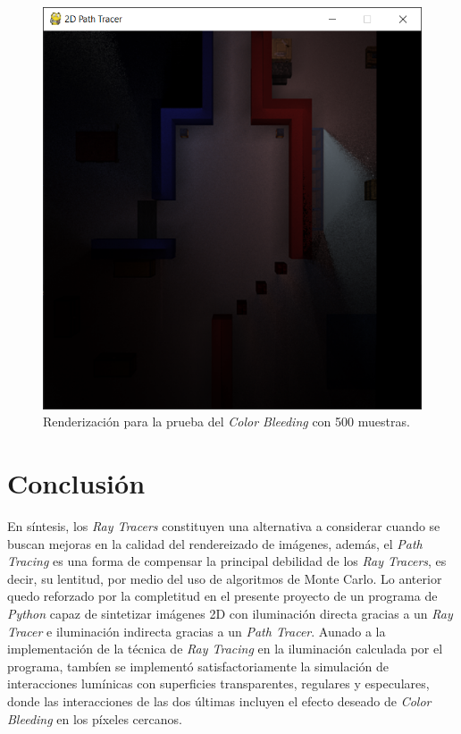 \documentclass[conference]{IEEEtran}
\begin{document}
\begin{figure}[htbp]
\centerline{\includegraphics[scale=0.68]{Imagenes/Complete Lighting (500 Samples Color Bleed).png}}
\caption{Renderización para la prueba del \textit{Color Bleeding} con 500 muestras.}
\label{500 muestras color bleeding.}
\end{figure}

\section{Conclusión}

En síntesis, los \textit{Ray Tracers} constituyen una alternativa a considerar cuando se buscan mejoras en la calidad del rendereizado de imágenes, además, el \textit{Path Tracing} es una forma de compensar la principal debilidad de los \textit{Ray Tracers}, es decir, su lentitud, por medio del uso de algoritmos de Monte Carlo. Lo anterior quedo reforzado por la completitud en el presente proyecto de un programa de \textit{Python} capaz de sintetizar imágenes 2D con iluminación directa gracias a un \textit{Ray Tracer} e iluminación indirecta gracias a un \textit{Path Tracer}. Aunado a la implementación de la técnica de \textit{Ray Tracing} en la iluminación calculada por el programa, tambíen se implementó satisfactoriamente la simulación de interacciones lumínicas con superficies transparentes, regulares y especulares, donde las interacciones de las dos últimas incluyen el efecto deseado de \textit{Color Bleeding} en los píxeles cercanos.
\end{document}
